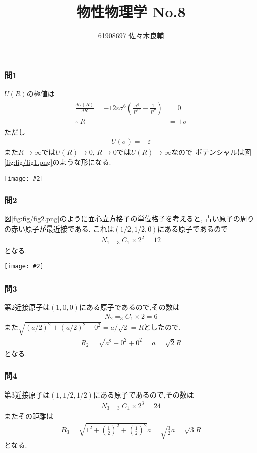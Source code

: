 \documentclass[uplatex,a4j,11pt,dvipdfmx]{jsarticle}
\makeatletter
\def\fgcaption{\def\@captype{figure}\caption}
\newcommand{\mfig}[3][width=15cm]{
\begin{center}
\texttt{[image: \#2]}
\fgcaption{#3 \label{fig:#2}}
\end{center}
}
\makeatother
\begin{document}
\title{物性物理学 No.8}
\author{61908697 佐々木良輔}
\date{}
\maketitle
\subsubsection*{問1}
$U(R)$の極値は
\begin{align}
  \begin{split}
    \frac{dU(R)}{dR}=-12\varepsilon\sigma^6\left(\frac{\sigma^6}{R^{13}}-\frac{1}{R^7}\right)&=0\\
    \therefore\ R&=\pm\sigma
  \end{split}
\end{align}
ただし
\begin{align}
  U(\sigma)=-\varepsilon
\end{align}
また$R\rightarrow\infty$では$U(R)\rightarrow 0$, $R\rightarrow 0$では$U(R)\rightarrow\infty$なので
ポテンシャルは図\ref{fig:fig/fig1.png}のような形になる.
\mfig[width=8cm]{fig/fig1.png}{ポテンシャルの概形}
\subsubsection*{問2}
図\ref{fig:fig/fig2.png}のように面心立方格子の単位格子を考えると,
青い原子の周りの赤い原子が最近接である.
これは$(1/2,1/2,0)$にある原子であるので
\begin{align}
  N_1=_3C_1\times 2^2=12
\end{align}
となる.
\mfig[width=8cm]{fig/fig2.png}{面心立方格子の配位数}
\subsubsection*{問3}
第2近接原子は$(1,0,0)$にある原子であるので,その数は
\begin{align}
  N_2=_3C_1\times2=6
\end{align}
また$\sqrt{(a/2)^2+(a/2)^2+0^2}=a/\sqrt{2}=R$としたので,
\begin{align}
  R_2=\sqrt{a^2+0^2+0^2}=a=\sqrt{2}R
\end{align}
となる.
\subsubsection*{問4}
第3近接原子は$(1,1/2,1/2)$にある原子であるので,その数は
\begin{align}
  N_3=_3C_1\times 2^3=24
\end{align}
またその距離は
\begin{align}
  R_3=\sqrt{1^2+\left(\frac{1}{2}\right)^2+\left(\frac{1}{2}\right)^2}a=\sqrt{\frac{3}{2}}a=\sqrt{3}R
\end{align}
となる.
\end{document}
